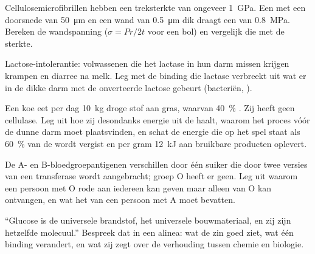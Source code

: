 \begin{exercise}[$\star\star$]\label{exo:b1:carbohydrates:8}
Cellulosemicrofibrillen hebben een treksterkte van ongeveer \qty{1}{GPa}. Een 
met een doorsnede van \qty{50}{\micro m} en een wand van \qty{0.5}{\micro m} dik
draagt een  van \qty{0.8}{MPa}. Bereken de wandspanning
($\sigma = Pr/2t$ voor een bol) en vergelijk die met de sterkte.
\end{exercise}

\begin{exercise}[$\star\star$]\label{exo:b1:carbohydrates:9}
Lactose-intolerantie: volwassenen die het lactase in hun darm missen krijgen
krampen en diarree na melk. Leg met de binding die lactase verbreekt uit wat er in
de dikke darm met de onverteerde lactose gebeurt (bacteriën, ).
\end{exercise}

\begin{exercise}[$\star\star\star$]\label{exo:b1:carbohydrates:10}
Een koe eet per dag \qty{10}{kg} droge stof aan gras, waarvan \qty{40}{\%}
. Zij heeft geen cellulase. Leg uit hoe zij desondanks energie uit de
 haalt, waarom het proces vóór de dunne darm moet plaatsvinden, en schat
de energie die op het spel staat als \qty{60}{\%} van de  wordt vergist
en per gram \qty{12}{kJ} aan bruikbare producten oplevert.
\end{exercise}

\begin{exercise}[$\star\star\star$]\label{exo:b1:carbohydrates:11}
De A- en B-bloedgroepantigenen verschillen door één suiker die door twee versies
van een transferase wordt aangebracht; groep O heeft er geen. Leg uit waarom een
persoon met O rode  aan iedereen kan geven maar alleen van O kan ontvangen,
en wat het  van een persoon met A moet bevatten.
\end{exercise}

\begin{exercise}[$\star\star\star$]\label{exo:b1:carbohydrates:12}
``Glucose is de universele brandstof,  het universele bouwmateriaal, en
zij zijn hetzelfde molecuul.'' Bespreek dat in een alinea: wat de zin goed ziet,
wat één binding verandert, en wat zij zegt over de verhouding tussen chemie en
biologie.
\end{exercise}

